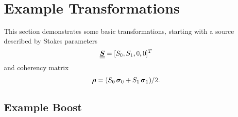 \section{Example Transformations}
\label{app:example_transformation}

This section demonstrates some basic transformations,
starting with a source described by Stokes parameters
\begin{equation}
    \underline{\underline{\mbox{\boldmath $S$}}}=[S_0,S_1,0,0]^T
\end{equation}
and coherency matrix
\begin{equation}
    \mbox{\boldmath $\rho$}=(S_0 \, \mbox{\boldmath $\sigma$}_{0} + S_1 \, \mbox{\boldmath $\sigma$}_{1})/2.
\end{equation}

\subsection{Example Boost}
\label{app:example_boost}

